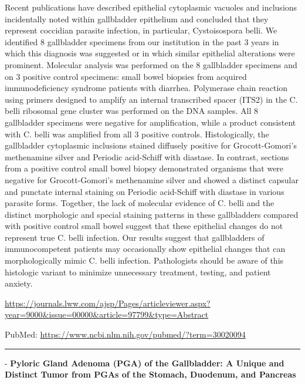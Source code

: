 \documentclass[]{article}
\begin{document}
Recent publications have described epithelial cytoplasmic vacuoles and
inclusions incidentally noted within gallbladder epithelium and
concluded that they represent coccidian parasite infection, in
particular, Cystoisospora belli. We identified 8 gallbladder specimens
from our institution in the past 3 years in which this diagnosis was
suggested or in which similar epithelial alterations were prominent.
Molecular analysis was performed on the 8 gallbladder specimens and on 3
positive control specimens: small bowel biopsies from acquired
immunodeficiency syndrome patients with diarrhea. Polymerase chain
reaction using primers designed to amplify an internal transcribed
spacer (ITS2) in the C. belli ribosomal gene cluster was performed on
the DNA samples. All 8 gallbladder specimens were negative for
amplification, while a product consistent with C. belli was amplified
from all 3 positive controls. Histologically, the gallbladder
cytoplasmic inclusions stained diffusely positive for Grocott-Gomori's
methenamine silver and Periodic acid-Schiff with diastase. In contrast,
sections from a positive control small bowel biopsy demonstrated
organisms that were negative for Grocott-Gomori's methenamine silver and
showed a distinct capsular and punctate internal staining on Periodic
acid-Schiff with diastase in various parasite forms. Together, the lack
of molecular evidence of C. belli and the distinct morphologic and
special staining patterns in these gallbladders compared with positive
control small bowel suggest that these epithelial changes do not
represent true C. belli infection. Our results suggest that gallbladders
of immunocompetent patients may occasionally show epithelial changes
that can morphologically mimic C. belli infection. Pathologists should
be aware of this histologic variant to minimize unnecessary treatment,
testing, and patient anxiety.

\url{https://journals.lww.com/ajsp/Pages/articleviewer.aspx?year=9000\&issue=00000\&article=97799\&type=Abstract}

PubMed: \url{https://www.ncbi.nlm.nih.gov/pubmed/?term=30020094}

{}

{}

\begin{center}\rule{0.5\linewidth}{\linethickness}\end{center}

 - \textbf{Pyloric Gland Adenoma (PGA) of the Gallbladder: A Unique and
Distinct Tumor from PGAs of the Stomach, Duodenum, and Pancreas}
\end{document}
